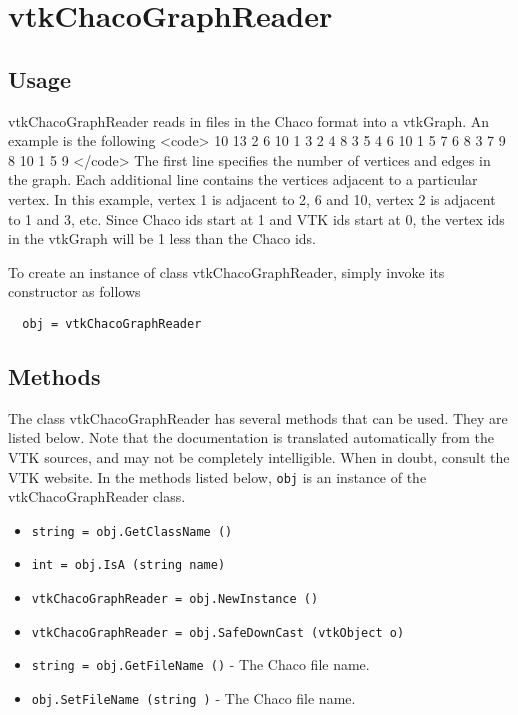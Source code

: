 \section{vtkChacoGraphReader}

\subsection{Usage}

 vtkChacoGraphReader reads in files in the Chaco format into a vtkGraph.
 An example is the following
 <code>
 10 13
 2 6 10
 1 3
 2 4 8
 3 5
 4 6 10
 1 5 7
 6 8
 3 7 9
 8 10
 1 5 9
 </code>
 The first line specifies the number of vertices and edges
 in the graph. Each additional line contains the vertices adjacent
 to a particular vertex.  In this example, vertex 1 is adjacent to
 2, 6 and 10, vertex 2 is adjacent to 1 and 3, etc.  Since Chaco ids
 start at 1 and VTK ids start at 0, the vertex ids in the vtkGraph
 will be 1 less than the Chaco ids.

To create an instance of class vtkChacoGraphReader, simply
invoke its constructor as follows
\begin{verbatim}
  obj = vtkChacoGraphReader
\end{verbatim}
\subsection{Methods}

The class vtkChacoGraphReader has several methods that can be used.
  They are listed below.
Note that the documentation is translated automatically from the VTK sources,
and may not be completely intelligible.  When in doubt, consult the VTK website.
In the methods listed below, \verb|obj| is an instance of the vtkChacoGraphReader class.
\begin{itemize}
\item  \verb|string = obj.GetClassName ()|

\item  \verb|int = obj.IsA (string name)|

\item  \verb|vtkChacoGraphReader = obj.NewInstance ()|

\item  \verb|vtkChacoGraphReader = obj.SafeDownCast (vtkObject o)|

\item  \verb|string = obj.GetFileName ()| -  The Chaco file name.

\item  \verb|obj.SetFileName (string )| -  The Chaco file name.

\end{itemize}
